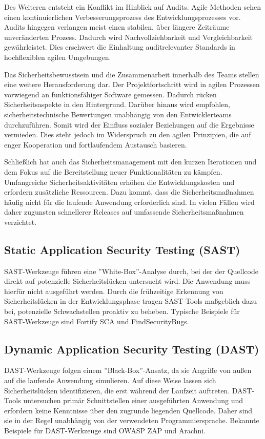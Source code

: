 \documentclass[acmtog]{acmart}
\begin{document}
Des Weiteren entsteht ein Konflikt im Hinblick auf Audits. 
Agile Methoden sehen einen kontinuierlichen Verbesserungsprozess des Entwicklungsprozesses vor. 
Audits hingegen verlangen meist einen stabilen, über längere Zeiträume unveränderten Prozess. 
Dadurch wird Nachvollziehbarkeit und Vergleichbarkeit gewährleistet.
Dies erschwert die Einhaltung auditrelevanter Standards in hochflexiblen agilen Umgebungen. \cite{oueslati_literature_2015}

Das Sicherheitsbewusstsein und die Zusammenarbeit innerhalb des Teams stellen eine weitere Herausforderung dar.
Der Projektfortschritt wird in agilen Prozessen vorwiegend an funktionsfähiger Software gemessen.
Dadurch rücken Sicherheitsaspekte in den Hintergrund. 
Darüber hinaus wird empfohlen, sicherheitstechnische Bewertungen unabhängig von den Entwicklerteams durchzuführen. 
Somit wird der Einfluss sozialer Beziehungen auf die Ergebnisse vermieden.
Dies steht jedoch im Widerspruch zu den agilen Prinzipien, die auf enger Kooperation und fortlaufendem Austausch basieren. \cite{oueslati_literature_2015}

Schließlich hat auch das Sicherheitsmanagement mit den kurzen Iterationen und dem Fokus auf die Bereitstellung neuer Funktionalitäten zu kämpfen. 
Umfangreiche Sicherheitsaktivitäten erhöhen die Entwicklungskosten und erfordern zusätzliche Ressourcen.
Dazu kommt, dass die Sicherheitsmaßnahmen häufig nicht für die laufende Anwendung erforderlich sind.
In vielen Fällen wird daher zugunsten schnellerer Releases auf umfassende Sicherheitsmaßnahmen verzichtet. \cite{oueslati_literature_2015}
 

\subsection{Static Application Security Testing (SAST)}
SAST-Werkzeuge führen eine ''White-Box''-Analyse durch, bei der der Quellcode direkt auf potenzielle Sicherheitslücken untersucht wird.
Die Anwendung muss hierfür nicht ausgeführt werden. 
Durch die frühzeitige Erkennung von Sicherheitslücken in der Entwicklungsphase tragen SAST-Tools maßgeblich dazu bei, potenzielle Schwachstellen proaktiv zu beheben. 
Typische Beispiele für SAST-Werkzeuge sind Fortify SCA und FindSecurityBugs. \cite{mateo_tudela_combining_2020}


\subsection{Dynamic Application Security Testing (DAST)}
DAST-Werkzeuge folgen einem ''Black-Box''-Ansatz, da sie Angriffe von außen auf die laufende Anwendung simulieren.
Auf diese Weise lassen sich Sicherheitslücken identifizieren, die erst während der Laufzeit auftreten. DAST-Tools untersuchen primär Schnittstellen einer ausgeführten Anwendung und erfordern keine Kenntnisse über den zugrunde liegenden Quellcode. 
Daher sind sie in der Regel unabhängig von der verwendeten Programmiersprache. 
Bekannte Beispiele für DAST-Werkzeuge sind OWASP ZAP und Arachni. \cite{mateo_tudela_combining_2020}
\end{document}
